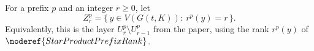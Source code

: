 \begin{definition}
For a prefix \(p\) and an integer \(r\ge0\), let
\[
  Z_r^p=\{\,y\in V(G(t,K)):\ r^p(y)=r\,\}.
\]
Equivalently, this is the layer \(U_r^p\setminus U_{r-1}^p\) from the
paper, using the rank \(r^p(y)\) of \(\noderef{StarProductPrefixRank}\).
\end{definition}
